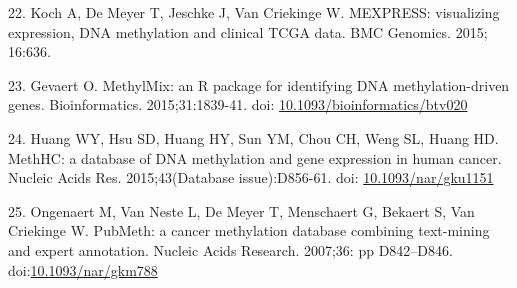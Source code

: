 \documentclass[10pt,letterpaper]{article}
\begin{document}
\leavevmode\hypertarget{ref-Koch2015}{}%
22. 	Koch A, De Meyer T, Jeschke J, Van Criekinge W. MEXPRESS: visualizing 
expression, DNA methylation and clinical TCGA data. BMC Genomics. 2015; 16:636.

\leavevmode\hypertarget{ref-Gevaert2015}{}%
23. Gevaert O. MethylMix: an R package for identifying DNA methylation-driven 
genes. Bioinformatics. 2015;31:1839-41. 
doi: \href{https://doi.org/10.1093/bioinformatics/btv020}{10.1093/bioinformatics/btv020}

\leavevmode\hypertarget{ref-Huang2015}{}%
24. Huang WY, Hsu SD, Huang HY, Sun YM, Chou CH, Weng SL, Huang HD. MethHC: a 
database of DNA methylation and gene expression in human cancer. Nucleic Acids 
Res. 2015;43(Database issue):D856-61. 
doi: \href{https://doi.org/10.1093/nar/gku1151}{10.1093/nar/gku1151}

\leavevmode\hypertarget{ref-Ongenaert2007}{}%
25. Ongenaert M, Van Neste L, De Meyer T, Menschaert G, Bekaert S, Van
Criekinge W. PubMeth: a cancer methylation database combining
text-mining and expert annotation. Nucleic Acids Research. 2007;36:
pp D842--D846.
doi:\href{https://doi.org/10.1093/nar/gkm788}{10.1093/nar/gkm788}

\nolinenumbers
\end{document}
